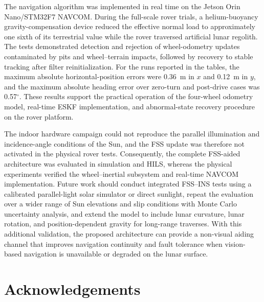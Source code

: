 \documentclass[]{IAC_style}
\begin{document}
The navigation algorithm was implemented in real time on the Jetson Orin Nano/STM32F7 NAVCOM. During the full-scale rover trials, a helium-buoyancy gravity-compensation device reduced the effective normal load to approximately one sixth of its terrestrial value while the rover traversed artificial lunar regolith. The tests demonstrated detection and rejection of wheel-odometry updates contaminated by pits and wheel--terrain impacts, followed by recovery to stable tracking after filter reinitialization. For the runs reported in the tables, the maximum absolute horizontal-position errors were 0.36~m in $x$ and 0.12~m in $y$, and the maximum absolute heading error over zero-turn and post-drive cases was 0.57$^\circ$. These results support the practical operation of the four-wheel odometry model, real-time ESKF implementation, and abnormal-state recovery procedure on the rover platform.

The indoor hardware campaign could not reproduce the parallel illumination and incidence-angle conditions of the Sun, and the FSS update was therefore not activated in the physical rover tests. Consequently, the complete FSS-aided architecture was evaluated in simulation and HILS, whereas the physical experiments verified the wheel--inertial subsystem and real-time NAVCOM implementation. Future work should conduct integrated FSS--INS tests using a calibrated parallel-light solar simulator or direct sunlight, repeat the evaluation over a wider range of Sun elevations and slip conditions with Monte Carlo uncertainty analysis, and extend the model to include lunar curvature, lunar rotation, and position-dependent gravity for long-range traverses. With this additional validation, the proposed architecture can provide a non-visual aiding channel that improves navigation continuity and fault tolerance when vision-based navigation is unavailable or degraded on the lunar surface.

\section*{Acknowledgements}


\end{document}
